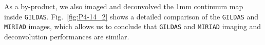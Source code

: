 \documentclass[11pt,twoside]{article}  %
\newcommand{\GILDAS}{\texttt{GILDAS}}
\newcommand{\MIRIAD}{\texttt{MIRIAD}}
\begin{document}
As a by-product, we also imaged and deconvolved the 1mm continuum map
inside \GILDAS{}. Fig.~\ref{fig:P4-14_2} shows a detailed comparison of the
\GILDAS{} and \MIRIAD{} images, which allows us to conclude that \GILDAS{}
and \MIRIAD{} imaging and deconvolution performances are similar.

%
% 
%
\end{document}
